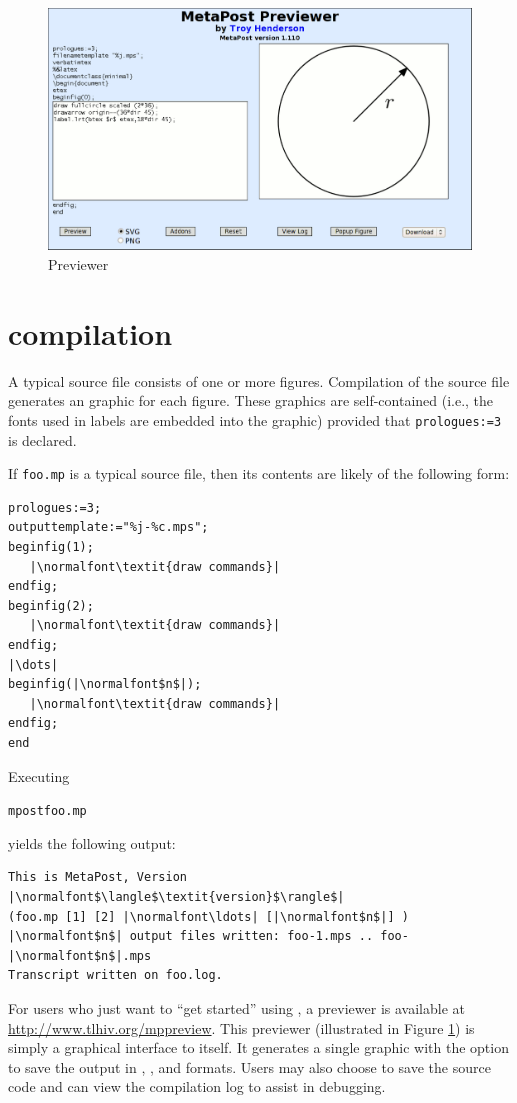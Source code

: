 \begin{figure}[tp]
  \centering
  \includegraphics[width=\textwidth]{previewer}
  \caption{\MP{} Previewer}
  \label{fig:previewer}
\end{figure}

\section{\MP{} compilation}
\label{sec:mpcompilation}

A typical \MP{} source file consists of one or more figures.
Compilation of the source file generates an \EPS{} graphic for each
figure.  These \EPS{} graphics are self-contained (i.e., the fonts used
in labels are embedded into the graphic) provided that
\lstinline{prologues:=3} is declared.

If \texttt{foo.mp} is a typical \MP{} source file, then its contents are
likely of the following form:

\begin{lstlisting}[xleftmargin=1.25\parindent]
prologues:=3;
outputtemplate:="%j-%c.mps";
beginfig(1);
   |\normalfont\textit{draw commands}|
endfig;
beginfig(2);
   |\normalfont\textit{draw commands}|
endfig;
|\dots|
beginfig(|\normalfont$n$|);
   |\normalfont\textit{draw commands}|
endfig;
end
\end{lstlisting}

Executing
\begin{flushleft}
  \hspace*{1.25\parindent}\texttt{mpostfoo.mp}
\end{flushleft}
yields the following output:

\begin{lstlisting}[xleftmargin=1.25\parindent]
This is MetaPost, Version |\normalfont$\langle$\textit{version}$\rangle$|
(foo.mp [1] [2] |\normalfont\ldots| [|\normalfont$n$|] )
|\normalfont$n$| output files written: foo-1.mps .. foo-|\normalfont$n$|.mps
Transcript written on foo.log.
\end{lstlisting}

For users who just want to ``get started'' using \MP{}, a \MP{}
previewer is available at \url{http://www.tlhiv.org/mppreview}.  This
previewer (illustrated in Figure \ref{fig:previewer}) is simply a
graphical interface to \MP{} itself.  It generates a single graphic with
the option to save the output in \EPS{}, \PDF{}, and \SVG{} formats.
Users may also choose to save the source code and can view the
compilation log to assist in debugging.
